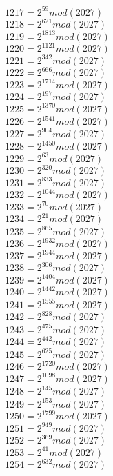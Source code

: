 \documentclass[12pt, letterpaper]{article}
\begin{document}
\begin{itemize}
\begin{multicols}{3}
$1217= 2^{59} mod (2027)$\\
$1218= 2^{621} mod (2027)$\\
$1219= 2^{1813} mod (2027)$\\
$1220= 2^{1121} mod (2027)$\\
$1221= 2^{342} mod (2027)$\\
$1222= 2^{666} mod (2027)$\\
$1223= 2^{1714} mod (2027)$\\
$1224= 2^{197} mod (2027)$\\
$1225= 2^{1370} mod (2027)$\\
$1226= 2^{1541} mod (2027)$\\
$1227= 2^{904} mod (2027)$\\
$1228= 2^{1450} mod (2027)$\\
$1229= 2^{63} mod (2027)$\\
$1230= 2^{320} mod (2027)$\\
$1231= 2^{833} mod (2027)$\\
$1232= 2^{1044} mod (2027)$\\
$1233= 2^{70} mod (2027)$\\
$1234= 2^{21} mod (2027)$\\
$1235= 2^{865} mod (2027)$\\
$1236= 2^{1932} mod (2027)$\\
$1237= 2^{1944} mod (2027)$\\
$1238= 2^{306} mod (2027)$\\
$1239= 2^{1404} mod (2027)$\\
$1240= 2^{1442} mod (2027)$\\
$1241= 2^{1555} mod (2027)$\\
$1242= 2^{828} mod (2027)$\\
$1243= 2^{475} mod (2027)$\\
$1244= 2^{442} mod (2027)$\\
$1245= 2^{625} mod (2027)$\\
$1246= 2^{1720} mod (2027)$\\
$1247= 2^{1098} mod (2027)$\\
$1248= 2^{145} mod (2027)$\\
$1249= 2^{153} mod (2027)$\\
$1250= 2^{1799} mod (2027)$\\
$1251= 2^{949} mod (2027)$\\
$1252= 2^{369} mod (2027)$\\
$1253= 2^{41} mod (2027)$\\
$1254= 2^{632} mod (2027)$\\

\end{multicols}
\end{itemize}
\end{document}
